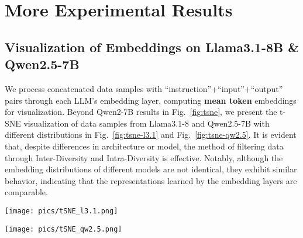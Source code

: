 \section{More Experimental Results}\label{sec:app-exp}
\subsection{Visualization of Embeddings on Llama3.1-8B \& Qwen2.5-7B}
\label{sec:appendix-div-tsne-all}

We process concatenated data samples with ``instruction''+``input''+``output'' pairs through each LLM's embedding layer, computing \textbf{mean token} embeddings for visualization. Beyond Qwen2-7B results in Fig.~\ref{fig:tsne}, we present the t-SNE visualization of data samples from Llama3.1-8 and Qwen2.5-7B with different distributions in Fig.~\ref{fig:tsne-l3.1} and Fig.~\ref{fig:tsne-qw2.5}. It is evident that, despite differences in architecture or model, the method of filtering data through Inter-Diversity and Intra-Diversity is effective. Notably, although the embedding distributions of different models are not identical, they exhibit similar behavior, indicating that the representations learned by the embedding layers are comparable.

\begin{figure*}[h]
    \centering
\texttt{[image: pics/tSNE\_l3.1.png]}
\vspace{-0.3cm}
    \caption{The t-SNE visualization of embeddings for data samples with different distributions on Llama3.1-8B. (a) The data pool of all 40,000 samples, (b) Randomly selected subset, (c) Distribution of data farthest from other domain centroids based on Inter-Diversity, (d) Distribution of data closest to other domain centroids based on Inter-Diversity, (e) Distribution of data closest to its own domain centroid based on Inter-Diversity, (f) Distribution of data farthest from its own domain centroid based on Inter-Diversity.}
    \label{fig:tsne-l3.1}
\end{figure*}

\begin{figure*}[h]
    \centering
\texttt{[image: pics/tSNE\_qw2.5.png]}
\vspace{-0.3cm}
    \caption{The t-SNE visualization of embeddings for data samples with different distributions on Qwen2.5-7B. (a) The data pool of all 40,000 samples, (b) Randomly selected subset, (c) Distribution of data farthest from other domain centroids based on Inter-Diversity, (d) Distribution of data closest to other domain centroids based on Inter-Diversity, (e) Distribution of data closest to its own domain centroid based on Inter-Diversity, (f) Distribution of data farthest from its own domain centroid based on Inter-Diversity.}
    \label{fig:tsne-qw2.5}
\end{figure*}




